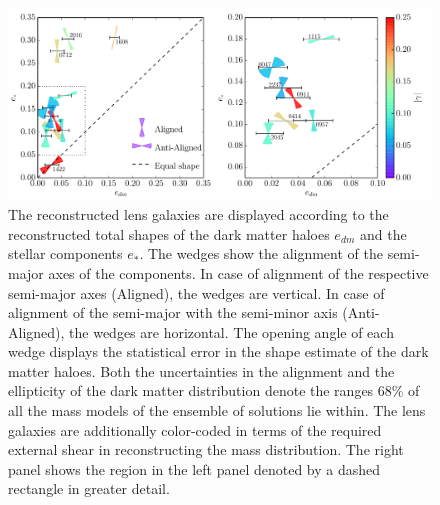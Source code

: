 \documentclass[useAMS,usenatbib]{mn2e}
\begin{document}
\begin{figure}
  \centering
  \includegraphics[width=\linewidth]{Figures/wedges_shears.pdf}
  \caption[width=\linewidth]{The reconstructed lens galaxies are displayed according to the reconstructed total shapes of the dark matter haloes $e_{dm}$ and the stellar components $e_{*}$. The wedges show the alignment of the semi-major axes of the components. In case of alignment of the respective semi-major axes (Aligned), the wedges are vertical. In case of alignment of the semi-major with the semi-minor axis (Anti-Aligned), the wedges are horizontal. The opening angle of each wedge displays the statistical error in the shape estimate of the dark matter haloes. Both the uncertainties in the alignment and the ellipticity of the dark matter distribution denote the ranges $68\%$ of all the mass models of the ensemble of solutions lie within. The lens galaxies are additionally color-coded in terms of the required external shear in reconstructing the mass distribution. The right panel shows the region in the left panel denoted by a dashed rectangle in greater detail.}
  \label{fig:wedgesall}
\end{figure}
\end{document}
